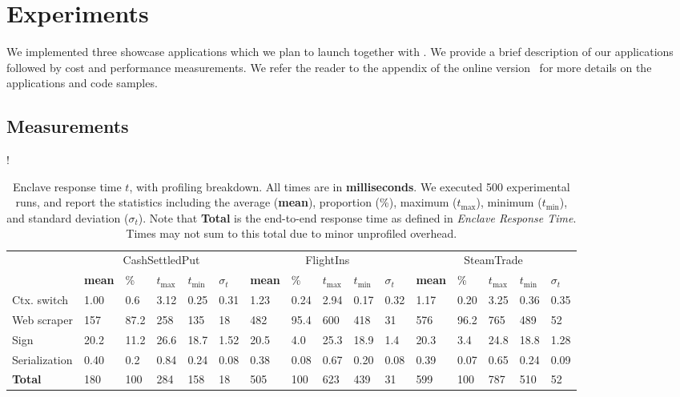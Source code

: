 \section{Experiments}
\label{sec:experiments}

We implemented three showcase applications which we plan to launch together with \tc.
We provide a brief description of our applications followed by cost and performance measurements.
We refer the reader to the appendix of the online version~\cite{cryptoeprint:2016:168}
for more details on the applications and code samples.



\subsection{Measurements}

\begin{table*}
\resizebox{\linewidth} {!}{
\begin{tabular}{l|lllll|lllll|lllll}
\toprule
& \multicolumn{5}{c|}{\sf CashSettledPut} &
  \multicolumn{5}{c|}{\sf FlightIns} &
  \multicolumn{5}{c}{\sf SteamTrade} \\
    & \textbf{mean} & \% & $t_{\max}$ & $t_{\min}$ & $\sigma_t$ & \textbf{mean}
    & \% & $t_{\max}$ & $t_{\min}$ & $\sigma_t$ & \textbf{mean} & \% & $t_{\max}$
    & $t_{\min}$ & $\sigma_t$\\
\midrule
    Ctx. switch & 1.00 & 0.6 & 3.12 & 0.25 & 0.31 
                & 1.23 & 0.24 & 2.94 & 0.17 & 0.32 
                & 1.17 & 0.20 & 3.25 & 0.36 & 0.35\\
    Web scraper & 157  & 87.2 & 258 & 135 & 18 
                & 482  & 95.4 & 600 & 418 & 31 
                & 576  & 96.2 & 765 & 489 & 52\\
    Sign        & 20.2 & 11.2 & 26.6 & 18.7 & 1.52 
                & 20.5 & 4.0 & 25.3 & 18.9 & 1.4 
                & 20.3 & 3.4 & 24.8 & 18.8 & 1.28\\
    Serialization 
                & 0.40 & 0.2 & 0.84 & 0.24 & 0.08 
                & 0.38 & 0.08 & 0.67 & 0.20 & 0.08 
                & 0.39 & 0.07 & 0.65 & 0.24 & 0.09\\
\midrule
\midrule
    \textbf{Total} 
                & 180 & 100 & 284 & 158 & 18 
                & 505 & 100 & 623 & 439 & 31 
                & 599 & 100 & 787 & 510 & 52 \\
\bottomrule
\end{tabular}
}
\caption{Enclave response time $t$, with profiling breakdown. All times are in {\bf milliseconds}.
We executed 500 experimental runs, and report
the statistics including 
the average ({\bf mean}), proportion (\%), maximum ($t_{\max}$),
minimum ($t_{\min}$), and standard deviation ($\sigma_t$). Note that {\bf Total} is the end-to-end response time as 
defined in \emph{Enclave Response Time}. Times may not
sum to this total due to minor unprofiled overhead.}
\label{tab:eval_profiling}
\vspace{-1em}
\end{table*}

